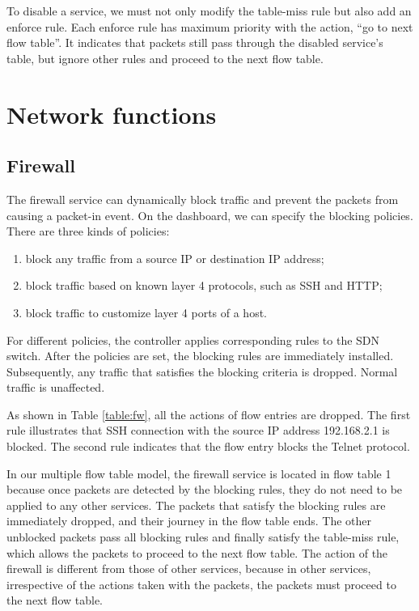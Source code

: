 To disable a service, we must not only modify the table-miss rule but also add an enforce rule. Each enforce rule has maximum priority with the action, ``go to next flow table''. It indicates that packets still pass through the disabled service’s table, but ignore other rules and proceed to the next flow table.



\section{Network functions} \label{sec:setwork_functions}
\subsection{Firewall}
The firewall service can dynamically block traffic and prevent the packets from causing a packet-in event.
On the dashboard, we can specify the blocking policies. There are three kinds of policies:
\begin{enumerate}[leftmargin=4em]
  \item block any traffic from a source IP or destination IP address;
  \item block traffic based on known layer 4 protocols, such as SSH and HTTP;
  \item block traffic to customize layer 4 ports of a host.
\end{enumerate}

For different policies, the controller applies corresponding rules to the SDN switch. After the policies are set, the blocking rules are immediately installed. Subsequently, any traffic that satisfies the blocking criteria is dropped. Normal traffic is unaffected.

As shown in Table \ref{table:fw}, all the actions of flow entries are dropped. The first rule illustrates that SSH connection with the source IP address 192.168.2.1 is blocked. The second rule indicates that the flow entry blocks the Telnet protocol.

In our multiple flow table model, the firewall service is located in flow table 1 because once packets are detected by the blocking rules, they do not need to be applied to any other services. The packets that satisfy the blocking rules are immediately dropped, and their journey in the flow table ends. The other unblocked packets pass all blocking rules and finally satisfy the table-miss rule, which allows the packets to proceed to the next flow table. The action of the firewall is different from those of other services, because in other services, irrespective of the actions taken with the packets, the packets must proceed to the next flow table.

